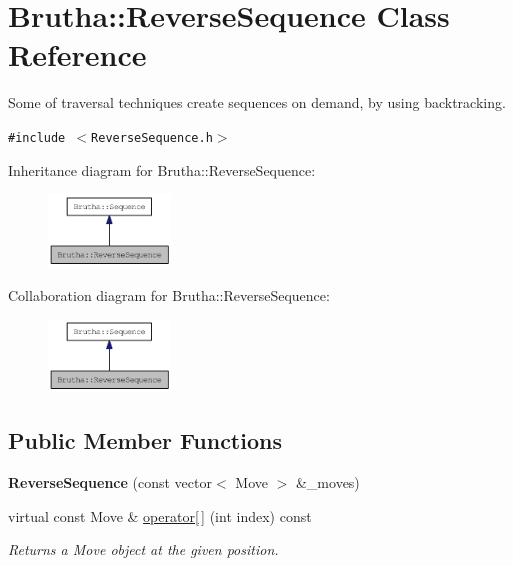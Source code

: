 \hypertarget{classBrutha_1_1ReverseSequence}{
\section{Brutha::ReverseSequence Class Reference}
\label{classBrutha_1_1ReverseSequence}
}
Some of traversal techniques create sequences on demand, by using backtracking.  


{\tt \#include $<$ReverseSequence.h$>$}

Inheritance diagram for Brutha::ReverseSequence:\nopagebreak
\begin{figure}[H]
\begin{center}
\leavevmode
\includegraphics[width=92pt]{classBrutha_1_1ReverseSequence__inherit__graph}
\end{center}
\end{figure}
Collaboration diagram for Brutha::ReverseSequence:\nopagebreak
\begin{figure}[H]
\begin{center}
\leavevmode
\includegraphics[width=92pt]{classBrutha_1_1ReverseSequence__coll__graph}
\end{center}
\end{figure}
\subsection*{Public Member Functions}
\begin{CompactItemize}
\item 
\hypertarget{classBrutha_1_1ReverseSequence_b82a0c24091e2ebff7f7a06f8b25e7d5}{
\textbf{ReverseSequence} (const vector$<$ Move $>$ \&\_\-moves)}
\label{classBrutha_1_1ReverseSequence_b82a0c24091e2ebff7f7a06f8b25e7d5}

\item 
\hypertarget{classBrutha_1_1ReverseSequence_604e7ea40ce375a3d28e1dd46dd5079d}{
virtual const Move \& \hyperlink{classBrutha_1_1ReverseSequence_604e7ea40ce375a3d28e1dd46dd5079d}{operator\mbox{[}$\,$\mbox{]}} (int index) const }
\label{classBrutha_1_1ReverseSequence_604e7ea40ce375a3d28e1dd46dd5079d}

\begin{CompactList}\small\item\em Returns a Move object at the given position. \item\end{CompactList}\end{CompactItemize}


